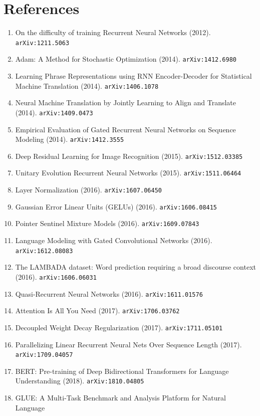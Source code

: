 \documentclass[11pt]{article}
\begin{document}
\section*{References}
\begin{enumerate}\small
  \item On the difficulty of training Recurrent Neural Networks (2012). \texttt{arXiv:1211.5063}
  \item Adam: A Method for Stochastic Optimization (2014). \texttt{arXiv:1412.6980}
  \item Learning Phrase Representations using RNN Encoder-Decoder for
  Statistical Machine Translation (2014). \texttt{arXiv:1406.1078}
  \item Neural Machine Translation by Jointly Learning to Align and Translate (2014). \texttt{arXiv:1409.0473}
  \item Empirical Evaluation of Gated Recurrent Neural Networks on Sequence
  Modeling (2014). \texttt{arXiv:1412.3555}
  \item Deep Residual Learning for Image Recognition (2015). \texttt{arXiv:1512.03385}
  \item Unitary Evolution Recurrent Neural Networks (2015). \texttt{arXiv:1511.06464}
  \item Layer Normalization (2016). \texttt{arXiv:1607.06450}
  \item Gaussian Error Linear Units (GELUs) (2016). \texttt{arXiv:1606.08415}
  \item Pointer Sentinel Mixture Models (2016). \texttt{arXiv:1609.07843}
  \item Language Modeling with Gated Convolutional Networks (2016). \texttt{arXiv:1612.08083}
  \item The LAMBADA dataset: Word prediction requiring a broad discourse context (2016). \texttt{arXiv:1606.06031}
  \item Quasi-Recurrent Neural Networks (2016). \texttt{arXiv:1611.01576}
  \item Attention Is All You Need (2017). \texttt{arXiv:1706.03762}
  \item Decoupled Weight Decay Regularization (2017). \texttt{arXiv:1711.05101}
  \item Parallelizing Linear Recurrent Neural Nets Over Sequence Length (2017). \texttt{arXiv:1709.04057}
  \item BERT: Pre-training of Deep Bidirectional Transformers for Language
  Understanding (2018). \texttt{arXiv:1810.04805}
  \item GLUE: A Multi-Task Benchmark and Analysis Platform for Natural Language

\end{enumerate}
\end{document}

